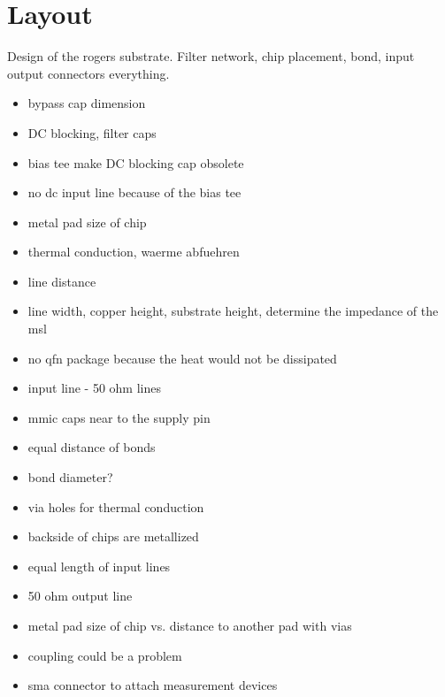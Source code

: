 \chapter{Layout}
Design of the rogers substrate. Filter network, chip placement, bond, input output connectors everything.
\begin{itemize}
	\item bypass cap dimension
	\item DC blocking, filter caps 
	\item bias tee make DC blocking cap obsolete
	\item no dc input line because of the bias tee
	\item metal pad size of chip
	\item thermal conduction, waerme abfuehren
	\item line distance
	\item line width, copper height, substrate height, determine the impedance of the msl
	\item no qfn package because the heat would not be dissipated
	\item input line - 50 ohm lines
	\item mmic caps near to the supply pin
	\item equal distance of bonds
	\item bond diameter?
	\item via holes for thermal conduction
	\item backside of chips are metallized
	\item equal length of input lines
	\item 50 ohm output line
	\item metal pad size of chip vs. distance to another pad with vias
	\item coupling could be a problem
	\item sma connector to attach measurement devices
\end{itemize}